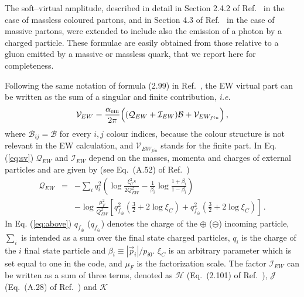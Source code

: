 \documentclass[11pt,a4paper]{article}
\newcommand\aem{\alpha_{\rm em}}
\begin{document}
The soft--virtual amplitude, described in detail in Section 2.4.2 of Ref.~\cite{Frixione:2007vw} in the case of massless coloured partons, and
in Section 4.3 of Ref.~\cite{Alioli:2010xd} in the case of massive
partons, were extended to include also the emission
of a photon by a charged particle.  These formulae are easily
obtained from those relative to a gluon emitted by a massive or massless
quark, that we report here for completeness.

Following the same notation of formula (2.99) in Ref.~\cite{Alioli:2010xd},
the EW virtual part can be written as the sum of a singular and 
finite contribution, {\it i.e.}
\begin{equation}
	\mathcal{V}_{EW}=\frac{\aem}{2\pi} \Big((\mathcal{Q}_{EW} +
        \mathcal{I}_{EW})\mathcal{B} + \mathcal{V}_{EW_{fin}}\Big) \, ,
								\label{eq:sv}
\end{equation}
where $\mathcal{B}_{ij}=\mathcal{B}$ for every $i,j$ colour indices,
because the colour structure is not relevant in the EW calculation, 
and $\mathcal{V}_{EW_{fin}}$ stands for the finite part.  In
Eq. (\ref{eq:sv}) $\mathcal{Q}_{EW}$ and $\mathcal{I}_{EW}$ depend on
the masses, momenta and charges of external particles and are given by
(see Eq.~(A.52) of Ref.~\cite{Alioli:2010xd})
\begin{equation}
\begin{array}{ccl}
	\mathcal{Q}_{EW} & = & -\displaystyle\sum_i q_i^2
        \left(\log\displaystyle\frac{\xi_C^2s}{2Q_{EW}^2}-
        \displaystyle\frac{1}{\beta_i}
        \log\frac{1+\beta_i}{1-\beta_i}\right)\\ & &
        -\log\displaystyle\frac{\mu_F^2}{Q_{EW}^2}
        \left[q_{f_{\oplus}}^2 (\frac{3}{2} + 2\log\xi_C) +
          q_{f_{\ominus}}^2 (\frac{3}{2} + 2\log\xi_C) \right] \, .
          \label{eq:above}
\end{array}
\end{equation}
In Eq. (\ref{eq:above}) $q_{f_{\oplus}}$ ($q_{f_\ominus}$) denotes the charge of the $\oplus$ ($\ominus$) incoming 
particle, $\sum_i$ is intended as a sum over the final state charged particles, $q_i$ is the 
charge of the $i$ final state particle and $\beta_i \equiv |\vec{p}_i|/p_{i0}$. 
$\xi_C$ is an arbitrary parameter which is set equal to one in the code, and $\mu_F$ is the 
factorization scale.
The factor 
$\mathcal{I}_{EW}$ can be written as a sum of three terms, denoted as $\mathcal{H}$ (Eq.~(2.101) of 
Ref.~\cite{Frixione:2007vw}), $\mathcal{J}$ (Eq.~(A.28) of Ref.~\cite{Alioli:2010xd}) and $\mathcal{K}$ 
\end{document}
